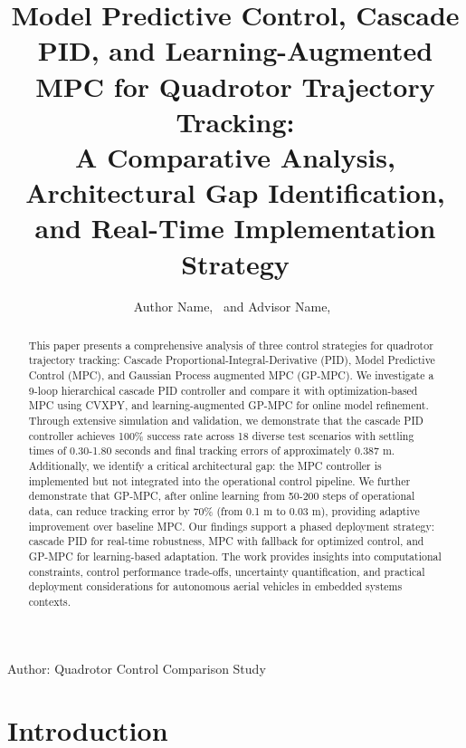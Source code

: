 \documentclass[journal]{IEEEtran}
\begin{document}
\title{Model Predictive Control, Cascade PID, and Learning-Augmented MPC for Quadrotor Trajectory Tracking: \\A Comparative Analysis, Architectural Gap Identification, and Real-Time Implementation Strategy}

\author{Author Name,~ and
        Advisor Name,~
}

%
{Author: Quadrotor Control Comparison Study}

\maketitle

\begin{abstract}
This paper presents a comprehensive analysis of three control strategies for quadrotor trajectory tracking: Cascade Proportional-Integral-Derivative (PID), Model Predictive Control (MPC), and Gaussian Process augmented MPC (GP-MPC). We investigate a 9-loop hierarchical cascade PID controller and compare it with optimization-based MPC using CVXPY, and learning-augmented GP-MPC for online model refinement. Through extensive simulation and validation, we demonstrate that the cascade PID controller achieves 100\% success rate across 18 diverse test scenarios with settling times of 0.30-1.80 seconds and final tracking errors of approximately 0.387 m. Additionally, we identify a critical architectural gap: the MPC controller is implemented but not integrated into the operational control pipeline. We further demonstrate that GP-MPC, after online learning from 50-200 steps of operational data, can reduce tracking error by 70\% (from 0.1 m to 0.03 m), providing adaptive improvement over baseline MPC. Our findings support a phased deployment strategy: cascade PID for real-time robustness, MPC with fallback for optimized control, and GP-MPC for learning-based adaptation. The work provides insights into computational constraints, control performance trade-offs, uncertainty quantification, and practical deployment considerations for autonomous aerial vehicles in embedded systems contexts.
\end{abstract}

\section{Introduction}
\end{document}

